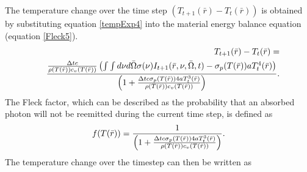 	The temperature change over the time step ${(T_{t+1}(\bar{r})-T_t(\bar{r}))}$ is obtained by substituting equation \ref{tempExp4} into the material energy balance equation (equation \ref{Fleck5}).
	\begin{eqnarray}
	\label{Fleck8}
	&&{T_{t+1}(\bar{r})-T_t(\bar{r})}= \nonumber \\&& {{{\Delta{t}c}\over{\rho(T(\bar{r})){c_v(T(\bar{r}))}}}\left({\int\int{d\nu}{d\bar{\Omega}}\sigma(\nu)I_{t+1}(\bar{r},\nu,\bar{\Omega},t)-\sigma_p(T(\bar{r})){aT_t^4(\bar{r})}}\right)\over{\left(1+{\Delta{t}c\sigma_p(T(\bar{r}))4aT^3_t(\bar{r})\over{\rho(T(\bar{r})){c_v(T(\bar{r}))}}}\right)}}.
	\end{eqnarray}
	The Fleck factor, which can be described as the probability that an absorbed photon will not be reemitted during the current time step,  is defined as
	\begin{equation}
	\label{FleckFactor}
	f(T(\bar{r}))={1\over{\left(1+{\Delta{t}c\sigma_p(T(\bar{r}))4aT^3_t(\bar{r})\over{\rho(T(\bar{r})){c_v(T(\bar{r}))}}}\right)}}.
	\end{equation}
	The temperature change over the timestep can then be written as
